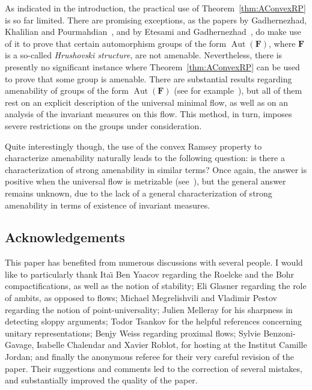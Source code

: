 \documentclass[11pt]{article}
\theoremstyle{definition}
\numberwithin{equation}{section}
\numberwithin{figure}{section}
\numberwithin{table}{section}
\newcommand*{\mF}{\mathbf{F}}
\DeclareMathOperator{\Aut}{Aut}
\begin{document}
As indicated in the introduction, the practical use of Theorem~\ref{thm:AConvexRP} is so far limited. There are promising exceptions, as the papers by Gadhernezhad, Khalilian and Pourmahdian~\cite{GKP}, and by Etesami and Gadhernezhad~\cite{EG}, do make use of it to prove that certain automorphism groups of the form $\Aut(\mF)$, where $\mF$ is a so-called \emph{Hrushovski structure}, are not amenable. Nevertheless, there is presently no significant instance where Theorem~\ref{thm:AConvexRP} can be used to prove that some group is amenable. There are substantial results regarding amenability of groups of the form $\Aut(\mF)$ (see for example~\cite{AKL, PS}), but all of them rest on an explicit description of the universal minimal flow, as well as on an analysis of the invariant measures on this flow. This method, in turn, imposes severe restrictions on the groups under consideration.

Quite interestingly though, the use of the convex Ramsey property to characterize amenability naturally leads to the following question: is there a characterization of strong amenability in similar terms? Once again, the answer is positive when the universal flow is metrizable (see~\cite{MNT}), but the general answer remains unknown, due to the lack of a general characterization of strong amenability in terms of existence of invariant measures.


\subsection*{Acknowledgements}

This paper has benefited from numerous discussions with several people. I would like to particularly thank Ita\"{\i} Ben Yaacov regarding the Roelcke and the Bohr compactifications, as well as the notion of stability; Eli Glasner regarding the role of ambits, as opposed to flows; Michael Megrelishvili and Vladimir Pestov regarding the notion of point-universality; Julien Melleray for his sharpness in detecting sloppy arguments; Todor Tsankov for the helpful references concerning unitary representations; Benjy Weiss regarding proximal flows; Sylvie Benzoni-Gavage, Isabelle Chalendar and Xavier Roblot, for hosting at the Institut Camille Jordan; and finally the anonymous referee for their very careful revision of the paper. Their suggestions and comments led to the correction of several mistakes, and substantially improved the quality of the paper.
\end{document}
